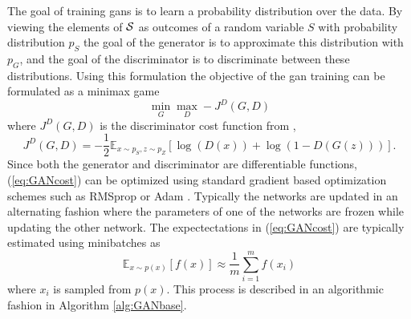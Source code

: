The goal of training \acrshort{gans} is to learn a probability distribution over the data. By viewing the elements of $\mathcal{S}$ as outcomes of a random variable $S$ with probability distribution $p_S$ the goal of the generator is to approximate this distribution with $p_G$, and the goal of the discriminator is to discriminate between these distributions. Using this formulation the objective of the \acrshort{gan} training can be formulated as a minimax game 
\begin{equation}
    \min_G \max_D -J^{D}(G, D)
\end{equation}
where $J^D(G, D)$ is the discriminator cost function from \parencite{goodfellow2016nips},
\begin{equation}
    J^D(G, D) = -\frac{1}{2}\mathbb{E}_{x \sim p_S, z \sim p_Z}\left[\log(D(x)) + \log(1 - D(G(z))) \right].
    \label{eq:GANcost}
\end{equation}
Since both the generator and discriminator are differentiable functions, (\ref{eq:GANcost}) can be optimized using standard gradient based optimization schemes such as RMSprop \parencite{tieleman2012lecture} or Adam \parencite{kingma2014adam}. Typically the networks are updated in an alternating fashion where the parameters of one of the networks are frozen while updating the other network. The expectectations in (\ref{eq:GANcost}) are typically estimated using minibatches as 
\begin{equation}
    \mathbb{E}_{x\sim p(x)}[f(x)] \approx \frac{1}{m}\sum_{i=1}^mf(x_i)
\end{equation}
where $x_i$ is sampled from $p(x)$. This process is described in an algorithmic fashion in Algorithm \ref{alg:GANbase}.


